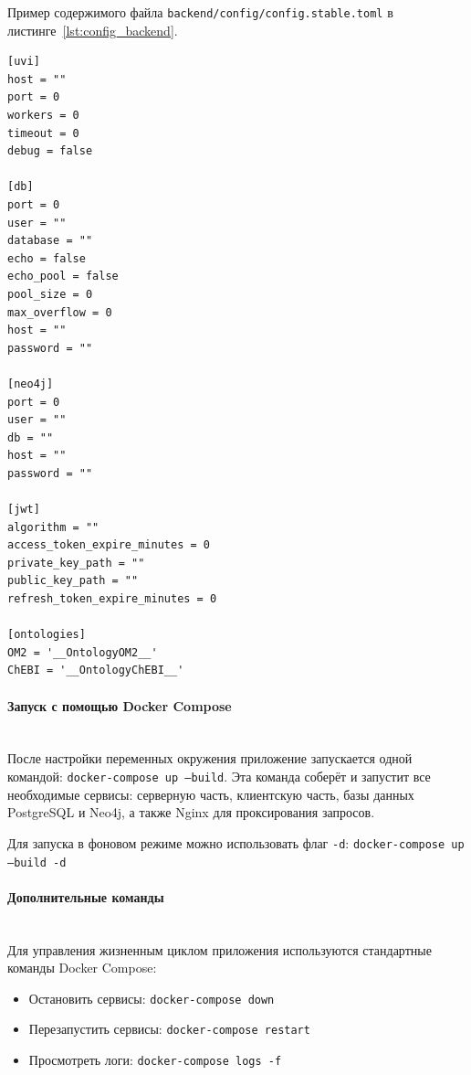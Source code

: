 Пример содержимого файла \texttt{backend/config/config.stable.toml} в листинге~\ref{lst:config_backend}.
\begin{lstlisting}[frame=single, basicstyle=\footnotesize\ttfamily, label={lst:config_backend}, caption={Заполнение конфигурационного файла серверного приложения},captionpos=b, breaklines=true, breakatwhitespace=true]
[uvi]
host = ""
port = 0
workers = 0
timeout = 0
debug = false

[db]
port = 0
user = ""
database = ""
echo = false
echo_pool = false
pool_size = 0
max_overflow = 0
host = ""
password = ""

[neo4j]
port = 0
user = ""
db = ""
host = ""
password = ""

[jwt]
algorithm = ""
access_token_expire_minutes = 0
private_key_path = ""
public_key_path = ""
refresh_token_expire_minutes = 0

[ontologies]
OM2 = '__OntologyOM2__'
ChEBI = '__OntologyChEBI__'
\end{lstlisting}

\paragraph{Запуск с помощью Docker Compose} \mbox{}\\

После настройки переменных окружения приложение запускается одной командой: \texttt{docker-compose up --build}.
Эта команда соберёт и запустит все необходимые сервисы: серверную часть, клиентскую часть, базы данных PostgreSQL и Neo4j, а также Nginx для проксирования запросов.

Для запуска в фоновом режиме можно использовать флаг \texttt{-d}: \texttt{docker-compose up --build -d}

\paragraph{Дополнительные команды} \mbox{}\\

Для управления жизненным циклом приложения используются стандартные команды Docker Compose:
\begin{itemize}
    \item Остановить сервисы: \texttt{docker-compose down}
    \item Перезапустить сервисы: \texttt{docker-compose restart}
    \item Просмотреть логи: \texttt{docker-compose logs -f}
\end{itemize}

